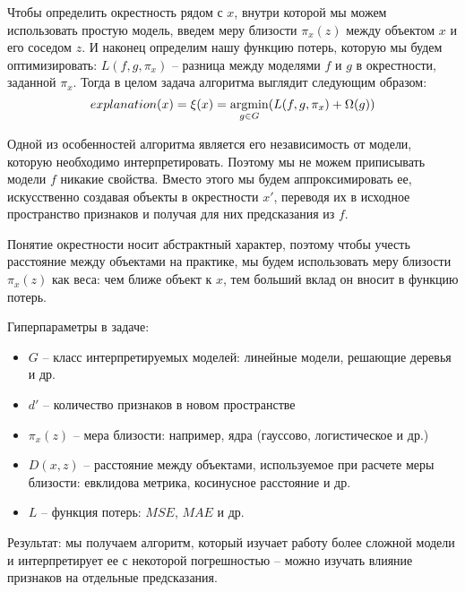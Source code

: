 Чтобы определить окрестность рядом с $x$, внутри которой мы можем использовать простую модель, введем меру близости $\pi_x(z)$ между объектом $x$ и его соседом $z$. И наконец определим нашу функцию потерь, которую мы будем оптимизировать: $L(f, g, \pi_x)$ -- разница между моделями $f$ и $g$ в окрестности, заданной $\pi_x$. Тогда в целом задача алгоритма выглядит следующим образом:
\[
explanation(x) = \xi(x) = \underset{g \in G}{\operatorname{argmin}} (L(f, g, \pi_x) + \Omega(g))
\]

Одной из особенностей алгоритма является его независимость от модели, которую необходимо интерпретировать. Поэтому мы не можем приписывать модели $f$ никакие свойства. Вместо этого мы будем аппроксимировать ее, искусственно создавая объекты в окрестности $x'$, переводя их в исходное пространство признаков и получая для них предсказания из $f$.

Понятие окрестности носит абстрактный характер, поэтому чтобы учесть расстояние между объектами на практике, мы будем использовать меру близости $\pi_x(z)$ как веса: чем ближе объект к $x$, тем больший вклад он вносит в функцию потерь.

Гиперпараметры в задаче:\\[-8mm]
\begin{itemize}
	\item $G$ -- класс интерпретируемых моделей: линейные модели, решающие деревья и др.\\[-6mm]
	\item $d'$ -- количество признаков в новом пространстве
	\item $\pi_x(z)$ -- мера близости: например, ядра (гауссово, логистическое и др.)\\[-6mm]
	\item $D(x,z)$ -- расстояние между объектами, используемое при расчете меры близости: евклидова метрика, косинусное расстояние и др.\\[-6mm]
	\item $L$ -- функция потерь: $MSE$, $MAE$ и др.\\[-6mm]
\end{itemize}


Результат: мы получаем алгоритм, который изучает работу более сложной модели и интерпретирует ее с некоторой погрешностью -- можно изучать влияние признаков на отдельные предсказания.
